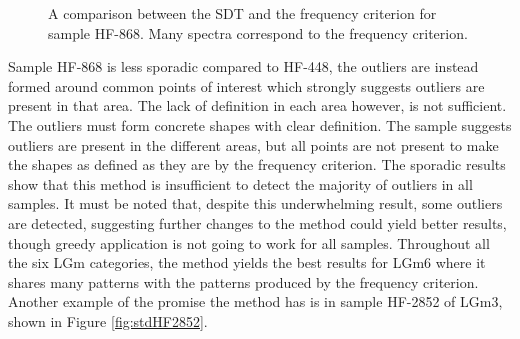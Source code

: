 \begin{figure}[H]
    \centering
    \qquad
    \caption{A comparison between the SDT and the frequency criterion for sample HF-868. Many spectra correspond to the frequency criterion.
\label{fig:stdHF868}}%
\end{figure}

Sample HF-868 is less sporadic compared to HF-448, the outliers are instead formed around common points of interest which strongly suggests outliers are present in that area. The lack of definition in each area however, is not sufficient. The outliers must form concrete shapes with clear definition. The sample suggests outliers are present in the different areas, but all points are not present to make the shapes as defined as they are by the frequency criterion. 
The sporadic results show that this method is insufficient to detect the majority of outliers in all samples. It must be noted that, despite this underwhelming result, some outliers are detected, suggesting further changes to the method could yield better results, though greedy application is not going to work for all samples. Throughout all the six LGm categories, the method yields the best results for LGm6 where it shares many patterns with the patterns produced by the frequency criterion. Another example of the promise the method has is in sample HF-2852 of LGm3, shown in Figure \ref{fig:stdHF2852}.

